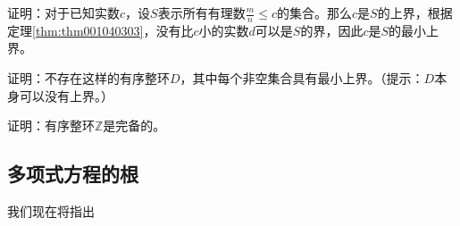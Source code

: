 证明：对于已知实数$c$，设$S$表示所有有理数$\frac{m}{n} \le c$的集合。那么$c$是$S$的上界，根据定理\ref{thm:thm001040303}，没有比$c$小的实数$d$可以是$S$的界，因此$c$是$S$的最小上界。

\begin{exercise}
证明：不存在这样的有序整环$D$，其中每个非空集合具有最小上界。（提示：$D$本身可以没有上界。）
\end{exercise}

\begin{exercise}
证明：有序整环$\mathbb{Z}$是完备的。
\end{exercise}

\subsection{多项式方程的根}\label{subsection0010404}
我们现在将指出








